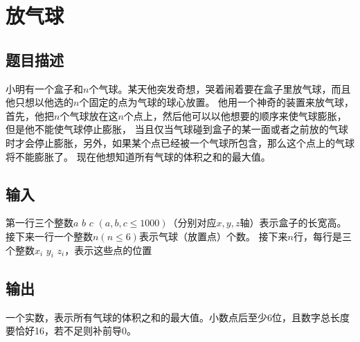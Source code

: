 \documentclass[UTF8]{ctexart}
\author{lx}
\date{\today}
\begin{document}
\section{放气球}
    \subsection{题目描述}
        小明有一个盒子和$n$个气球。某天他突发奇想，哭着闹着要在盒子里放气球，而且他只想以他选的$n$个固定的点为气球的球心放置。
        他用一个神奇的装置来放气球，首先，他把$n$个气球放在这$n$个点上，然后他可以以他想要的顺序来使气球膨胀，但是他不能使气球停止膨胀，
        当且仅当气球碰到盒子的某一面或者之前放的气球时才会停止膨胀，另外，如果某个点已经被一个气球所包含，那么这个点上的气球将不能膨胀了。
        现在他想知道所有气球的体积之和的最大值。
    \subsection{输入}
        第一行三个整数$a$ $b$ $c$ $(a,b,c\le 1000)$（分别对应$x,y,z$轴）表示盒子的长宽高。
        接下来一行一个整数$n(n\le 6)$表示气球（放置点）个数。
        接下来$n$行，每行是三个整数$x_i$ $y_i$ $z_i$，表示这些点的位置
    \subsection{输出}
        一个实数，表示所有气球的体积之和的最大值。小数点后至少6位，且数字总长度要恰好16，若不足则补前导0。
\end{document}
